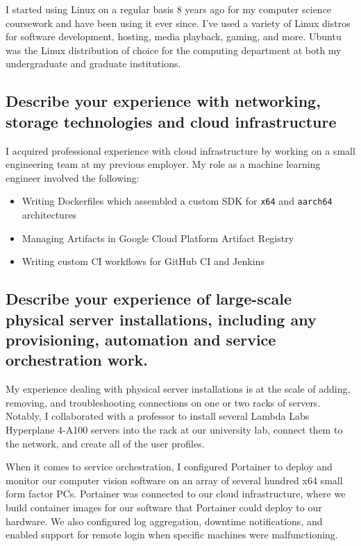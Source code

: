 \documentclass{article}
\begin{document}
I started using Linux on a regular basis 8 years ago for my computer
science coursework and have been using it ever since. I've used a
variety of Linux distros for software development, hosting, media playback, gaming, and more.
Ubuntu was the Linux distribution of choice for the computing department
at both my undergraduate and graduate institutions.

\subsection{Describe your experience with networking, storage technologies and
  cloud infrastructure}

I acquired professional experience with cloud infrastructure by working on a
small engineering team at my previous employer. My role as a machine learning engineer
involved the following:
\begin{itemize}
  \item Writing Dockerfiles which assembled a custom SDK for \texttt{x64} and
        \texttt{aarch64} architectures
  \item Managing Artifacts in Google Cloud Platform Artifact Registry
  \item Writing custom CI workflows for GitHub CI and Jenkins
\end{itemize}

\subsection{Describe your experience of large-scale physical server
  installations, including any provisioning, automation and service orchestration
  work.}

My experience dealing with physical server installations is at the scale of
adding, removing, and troubleshooting connections on one or two racks of
servers. Notably, I collaborated with a professor to install several Lambda Labs
Hyperplane 4-A100 servers into the rack at our university lab, connect them to
the network, and create all of the user profiles.

When it comes to service orchestration, I configured Portainer to deploy and
monitor our computer vision software on an array of several hundred x64 small
form factor PCs. Portainer was connected to our cloud infrastructure, where we
build container images for our software that Portainer could deploy to our
hardware. We also configured log aggregation, downtime notifications, and
enabled support for remote login when specific machines were malfunctioning.
\end{document}
